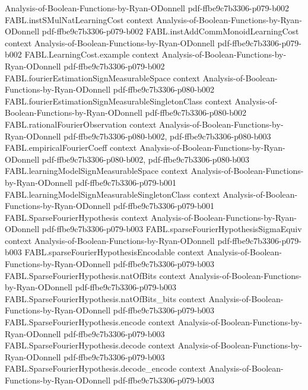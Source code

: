 \begin{theorem}
  {Analysis-of-Boolean-Functions-by-Ryan-ODonnell}
  {pdf-ffbe9c7b3306-p079-b002}
\proofstep
  {FABL.instSMulNatLearningCost}
  {context}
  {Analysis-of-Boolean-Functions-by-Ryan-ODonnell}
  {pdf-ffbe9c7b3306-p079-b002}
\proofstep
  {FABL.instAddCommMonoidLearningCost}
  {context}
  {Analysis-of-Boolean-Functions-by-Ryan-ODonnell}
  {pdf-ffbe9c7b3306-p079-b002}
\proofstep
  {FABL.LearningCost.example}
  {context}
  {Analysis-of-Boolean-Functions-by-Ryan-ODonnell}
  {pdf-ffbe9c7b3306-p079-b002}
\proofstep
  {FABL.fourierEstimationSignMeasurableSpace}
  {context}
  {Analysis-of-Boolean-Functions-by-Ryan-ODonnell}
  {pdf-ffbe9c7b3306-p080-b002}
\proofstep
  {FABL.fourierEstimationSignMeasurableSingletonClass}
  {context}
  {Analysis-of-Boolean-Functions-by-Ryan-ODonnell}
  {pdf-ffbe9c7b3306-p080-b002}
\proofstep
  {FABL.rationalFourierObservation}
  {context}
  {Analysis-of-Boolean-Functions-by-Ryan-ODonnell}
  {pdf-ffbe9c7b3306-p080-b002,
    pdf-ffbe9c7b3306-p080-b003}
\proofstep
  {FABL.empiricalFourierCoeff}
  {context}
  {Analysis-of-Boolean-Functions-by-Ryan-ODonnell}
  {pdf-ffbe9c7b3306-p080-b002,
    pdf-ffbe9c7b3306-p080-b003}
\proofstep
  {FABL.learningModelSignMeasurableSpace}
  {context}
  {Analysis-of-Boolean-Functions-by-Ryan-ODonnell}
  {pdf-ffbe9c7b3306-p079-b001}
\proofstep
  {FABL.learningModelSignMeasurableSingletonClass}
  {context}
  {Analysis-of-Boolean-Functions-by-Ryan-ODonnell}
  {pdf-ffbe9c7b3306-p079-b001}
\proofstep
  {FABL.SparseFourierHypothesis}
  {context}
  {Analysis-of-Boolean-Functions-by-Ryan-ODonnell}
  {pdf-ffbe9c7b3306-p079-b003}
\proofstep
  {FABL.sparseFourierHypothesisSigmaEquiv}
  {context}
  {Analysis-of-Boolean-Functions-by-Ryan-ODonnell}
  {pdf-ffbe9c7b3306-p079-b003}
\proofstep
  {FABL.sparseFourierHypothesisEncodable}
  {context}
  {Analysis-of-Boolean-Functions-by-Ryan-ODonnell}
  {pdf-ffbe9c7b3306-p079-b003}
\proofstep
  {FABL.SparseFourierHypothesis.natOfBits}
  {context}
  {Analysis-of-Boolean-Functions-by-Ryan-ODonnell}
  {pdf-ffbe9c7b3306-p079-b003}
\proofstep
  {FABL.SparseFourierHypothesis.natOfBits_bits}
  {context}
  {Analysis-of-Boolean-Functions-by-Ryan-ODonnell}
  {pdf-ffbe9c7b3306-p079-b003}
\proofstep
  {FABL.SparseFourierHypothesis.encode}
  {context}
  {Analysis-of-Boolean-Functions-by-Ryan-ODonnell}
  {pdf-ffbe9c7b3306-p079-b003}
\proofstep
  {FABL.SparseFourierHypothesis.decode}
  {context}
  {Analysis-of-Boolean-Functions-by-Ryan-ODonnell}
  {pdf-ffbe9c7b3306-p079-b003}
\proofstep
  {FABL.SparseFourierHypothesis.decode_encode}
  {context}
  {Analysis-of-Boolean-Functions-by-Ryan-ODonnell}
  {pdf-ffbe9c7b3306-p079-b003}

\end{theorem}
